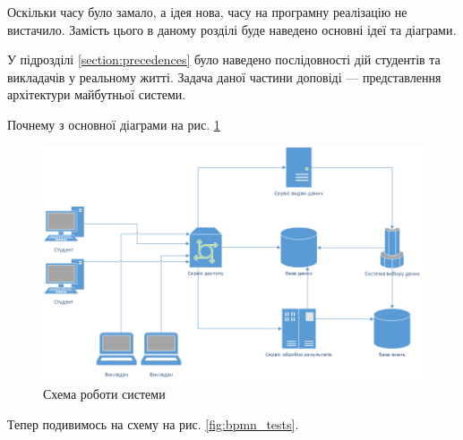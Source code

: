 




Оскільки часу було замало, а ідея нова, часу на програмну реалізацію не
вистачило.
Замість цього в даному розділі буде наведено основні ідеї та діаграми.

У підрозділі \ref{section:precedences} було наведено послідовності дій студентів
та викладачів у реальному житті.
Задача даної частини доповіді --- представлення архітектури майбутньої системи.

Почнему з основної діаграми на рис. \ref{fig:scheme_main}

\begin{figure}[htbp]
    \center\includegraphics[width=\textwidth]{images/scheme_main.png}
    \caption{Схема роботи системи}
    \label{fig:scheme_main}
\end{figure}

Тепер подивимось на схему на рис. \ref{fig:bpmn_tests}.

